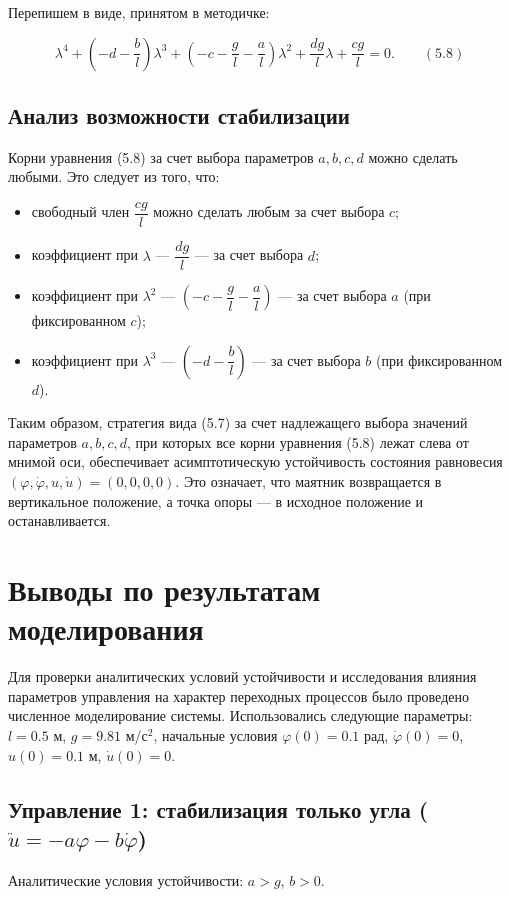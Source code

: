 \documentclass[a4paper, 12pt]{article}
\begin{document}
Перепишем в виде, принятом в методичке:

\[
\boxed{\lambda^4 + \left( -d - \frac{b}{l} \right) \lambda^3 + \left( -c - \frac{g}{l} - \frac{a}{l} \right) \lambda^2 + \frac{dg}{l} \lambda + \frac{cg}{l} = 0.} \qquad (5.8)
\]

\subsection{Анализ возможности стабилизации}

Корни уравнения (5.8) за счет выбора параметров $a, b, c, d$ можно сделать любыми. Это следует из того, что:
\begin{itemize}
    \item свободный член $\dfrac{cg}{l}$ можно сделать любым за счет выбора $c$;
    \item коэффициент при $\lambda$ — $\dfrac{dg}{l}$ — за счет выбора $d$;
    \item коэффициент при $\lambda^2$ — $\left( -c - \dfrac{g}{l} - \dfrac{a}{l} \right)$ — за счет выбора $a$ (при фиксированном $c$);
    \item коэффициент при $\lambda^3$ — $\left( -d - \dfrac{b}{l} \right)$ — за счет выбора $b$ (при фиксированном $d$).
\end{itemize}

Таким образом, стратегия вида (5.7) за счет надлежащего выбора значений параметров $a, b, c, d$, при которых все корни уравнения (5.8) лежат слева от мнимой оси, обеспечивает асимптотическую устойчивость состояния равновесия $(\varphi, \dot{\varphi}, u, \dot{u}) = (0,0,0,0)$. Это означает, что маятник возвращается в вертикальное положение, а точка опоры — в исходное положение и останавливается.

\newpage
\section{Выводы по результатам моделирования}

Для проверки аналитических условий устойчивости и исследования влияния параметров управления на характер переходных процессов было проведено численное моделирование системы. Использовались следующие параметры: $l = 0.5$ м, $g = 9.81$ м/с$^2$, начальные условия $\varphi(0) = 0.1$ рад, $\dot{\varphi}(0) = 0$, $u(0) = 0.1$ м, $\dot{u}(0) = 0$.

\subsection{Управление 1: стабилизация только угла ($\ddot{u} = -a\varphi - b\dot{\varphi}$)}
Аналитические условия устойчивости: $a > g$, $b > 0$.
\end{document}

